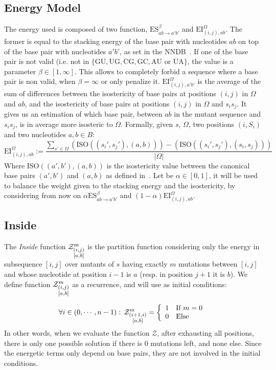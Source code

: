 \subsection{Energy Model}
The energy used is composed of two function, $\text{ES}^{\beta}_{ab\to a'b'}$ and 
$\text{EI}^{\Omega}_{(i,j),ab}$. The former is equal to the 
stacking energy of the base pair with nucleotides $ab$ on top of the base pair with nucleotides 
$a'b'$, as set in the NNDB~\cite{Turner2010}. If one of the base pair is not valid (i.e. not in 
$\{\text{GU},\text{UG},\text{CG},\text{GC}, \text{AU or UA}\}$, the value is a parameter 
$\beta \in [1,\infty]$. This allows
to completely forbid a sequence where a base pair is non valid, when $\beta = \infty$ or only 
penalize it.
$\text{EI}^{\Omega}_{(i,j), a'b'}$ is the average of the sum of differences between 
the isostericity of base pairs
 at positions $(i,j)$ in $\Omega$ and $ab$, and the isostericity
of base pairs at positions $(i,j)$ in $\Omega$ and $s_is_j$. 
It gives us an estimation of which  base pair, between $ab$ in the mutant sequence
 and $s_is_j$, is in average more isosteric to $\Omega$.
Formally, given $s$, $\Omega$, two positions $(i,S_i)$ and two nucleotides $a,b\in B$:
 $$
 	\text{EI}^{\Omega}_{(i,j),ab}:=
	\frac{
		\displaystyle
		\sum_{s'\in\Omega}
		\left(
			\text{ISO}((s_i',s_j'),(a,b))
		\right)-
		\left(
			\text{ISO}((s_i',s_j'),(s_i,s_j))		
		\right)
	}{
		\displaystyle
		|\Omega|
	}
 $$
  Where $\text{ISO}((a',b'),(a,b))$ is the isostericity value 
 between  the canonical base pairs $(a',b')$ and $(a,b)$  as defined in~\cite{Stombaugh2009}. 
 Let be $\alpha\in[0,1]$, it 
 will be used to balance the weight given to the stacking energy and the isostericity, 
 by considering from now on $\alpha\text{ES}^{\beta}_{ab\to a'b'}$ and 
$(1-\alpha)\text{EI}^{\Omega}_{(i,j),ab}$.
	
\subsection{Inside}
The \emph{Inside} function $\Z{i,j}{m}{a,b}$ is the partition function considering only the 
energy in subsequence $[i,j]$ over mutants of $s$ having exactly $m$ mutations between $[i,j]$ and whose nucleotide at position $i-1$ is $a$ (resp. in position $j+1$ it is $b$).
We define function $\Z{i,j}{m}{a,b}$ as a recurrence, and will use as initial conditions:

\[
	\forall i \in (0,\cdots,n-1):\, \Z{i+1,i}{m}{a,b}=\left\{
	\begin{array}{ll}
		1 &\text{If } m = 0\\
		0 &\text{Else }
	\end{array}\right.
\]
In other words, when we evaluate the function $\mathcal Z$, after exhausting all positions, there 
is only one possible solution if there is $0$ mutations left, and none else. Since the 
energetic terms only depend on base pairs, they are not involved in the initial conditions. 

